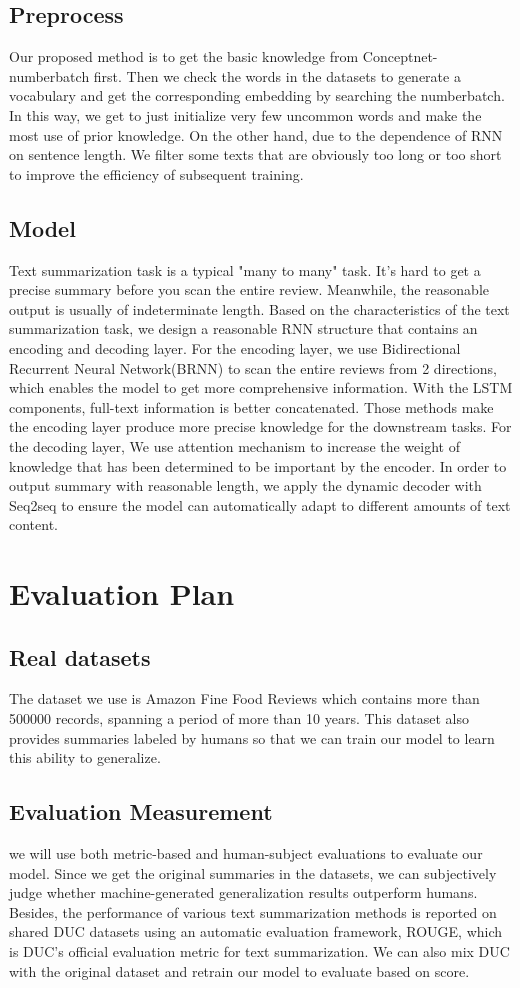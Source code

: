 \documentclass[conference]{IEEEtran}
\begin{document}
\subsection{Preprocess}
Our proposed method is to get the basic knowledge from Conceptnet-numberbatch first. Then we check the words in the datasets to generate a vocabulary and get the corresponding embedding by searching the numberbatch. In this way, we get to just initialize very few uncommon words and make the most use of prior knowledge. On the other hand, due to the dependence of RNN on sentence length. We filter some texts that are obviously too long or too short to improve the efficiency of subsequent training. 
\subsection{Model}
Text summarization task is a typical "many to many" task. It's hard to get a precise summary before you scan the entire review. Meanwhile, the reasonable output is usually of indeterminate length. Based on the characteristics of the text summarization task, we design a reasonable RNN structure that contains an encoding and decoding layer. For the encoding layer, we use Bidirectional Recurrent Neural Network(BRNN) to scan the entire reviews from 2 directions, which enables the model to get more comprehensive information. With the LSTM components, full-text information is better concatenated. Those methods make the encoding layer produce more precise knowledge for the downstream tasks. For the decoding layer, We use attention mechanism to increase the weight of knowledge that has been determined to be important by the encoder. In order to output summary with reasonable length, we apply the dynamic decoder with Seq2seq to ensure the model can automatically adapt to different amounts of text content.

\section{Evaluation Plan}
\subsection{Real datasets}
The dataset we use is Amazon Fine Food Reviews which contains more than 500000 records, spanning a period of more than 10 years. This dataset also provides summaries labeled by humans so that we can train our model to learn this ability to generalize. 
\subsection{Evaluation Measurement}
we will use both metric-based and human-subject evaluations to evaluate our model. Since we get the original summaries in the datasets, we can subjectively judge whether machine-generated generalization results outperform humans.  Besides, the performance of various text summarization methods is reported on shared DUC datasets using an automatic evaluation framework, ROUGE, which is DUC’s official evaluation metric for text summarization. We can also mix DUC with the original dataset and retrain our model to evaluate based on score.


\end{document}
